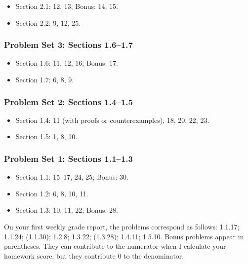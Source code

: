 \begin{itemize}
\item Section 2.1: 12, 13; Bonus: 14, 15.

\item Section 2.2: 9, 12, 25.

\end{itemize}

\subsubsection{Problem Set 3: Sections 1.6--1.7}
\label{problemset3:sections1.6--1.7}

\begin{itemize}
\item Section 1.6: 11, 12, 16; Bonus: 17.

\item Section 1.7: 6, 8, 9.

\end{itemize}

\subsubsection{Problem Set 2: Sections 1.4--1.5}
\label{problemset2:sections1.4--1.5}

\begin{itemize}
\item Section 1.4: 11 (with proofs or counterexamples), 18, 20, 22, 23.

\item Section 1.5: 1, 8, 10.

\end{itemize}

\subsubsection{Problem Set 1: Sections 1.1--1.3}
\label{problemset1:sections1.1--1.3}

\begin{itemize}
\item Section 1.1: 15--17, 24, 25; Bonus: 30.

\item Section 1.2: 6, 8, 10, 11.

\item Section 1.3: 10, 11, 22; Bonus: 28.

\end{itemize}

On your first weekly grade report, the problems correspond as follows: 1.1.17; 1.1.24; (1.1.30); 1.2.8; 1.3.22; (1.3.28); 1.4.11; 1.5.10. Bonus problems appear in parentheses. They can contribute to the numerator when I calculate your homework score, but they contribute 0 to the denominator.




